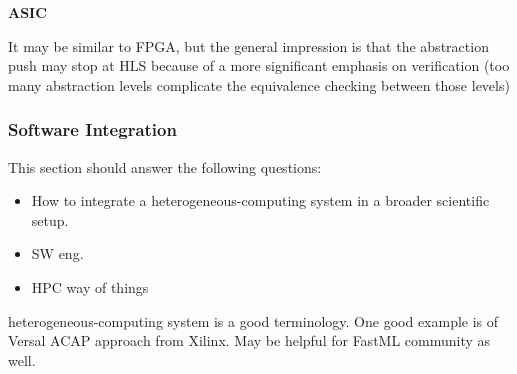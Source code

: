 








\clearpage
\textbf{ASIC}

It may be similar to FPGA, but the general impression is that the abstraction push may stop at HLS because of a more significant emphasis on verification (too many abstraction levels complicate the equivalence checking between those levels)

\subsubsection{Software Integration}
This section should answer the following questions:
\begin{itemize}
    \item How to integrate a heterogeneous-computing system in a broader scientific setup.
    \item SW eng.
    \item HPC way of things
\end{itemize}
heterogeneous-computing system is a good terminology. One good example is of Versal ACAP approach from Xilinx. May be helpful for FastML community as well.